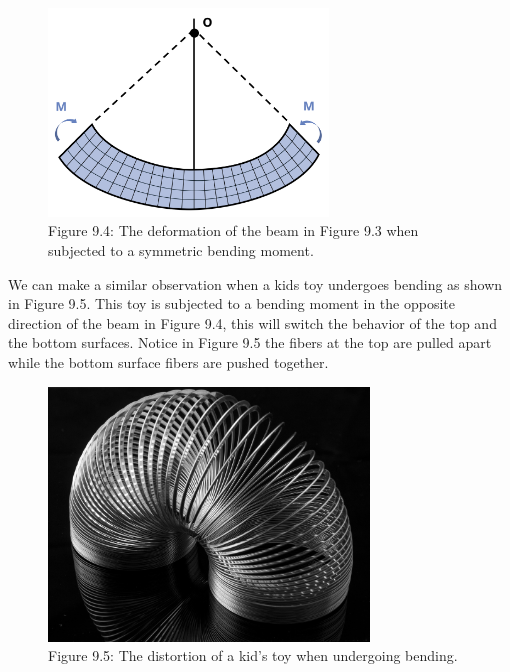 \documentclass[
  letterpaper,
  DIV=11,
  numbers=noendperiod]{scrreprt}
\theoremstyle{definition}
\theoremstyle{remark}
\begin{document}
\begin{figure}[H]

{\centering \includegraphics[width=2.92708in,height=\textheight]{images/CH9 PNGs/Figure 9.4.png}

}

\caption{Figure 9.4: The deformation of the beam in Figure 9.3 when
subjected to a symmetric bending moment.}

\end{figure}%

We can make a similar observation when a kids toy undergoes bending as
shown in Figure 9.5. This toy is subjected to a bending moment in the
opposite direction of the beam in Figure 9.4, this will switch the
behavior of the top and the bottom surfaces. Notice in Figure 9.5 the
fibers at the top are pulled apart while the bottom surface fibers are
pushed together.

\begin{figure}[H]

{\centering \includegraphics[width=3.35417in,height=\textheight]{images/CH9 PNGs/Figure 9.5.jpg}

}

\caption{Figure 9.5: The distortion of a kid's toy when undergoing
bending.}

\end{figure}%
\end{document}
